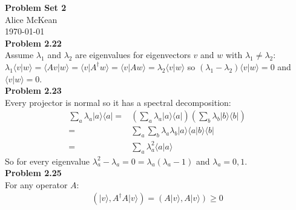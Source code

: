 \documentclass[fleqn]{article}
\newcommand{\problem}[1]{\large\textbf{Problem #1}\normalsize}
\newcommand{\bra}[1]{\ensuremath{\langle #1 |}}
\newcommand{\ket}[1]{\ensuremath{| #1 \rangle}}
\newcommand{\innerF}[2]{\ensuremath{\langle #1 | #2 \rangle}}
\newcommand{\outerF}[2]{\ket{#1} \bra{#2}}
\begin{document}
\noindent\Large\textbf{Problem Set 2} \\
\normalsize
Alice McKean \\
\today \\

\problem{2.22} \\
Assume $\lambda_1$ and $\lambda_2$ are eigenvalues for eigenvectors $v$ and $w$
with $\lambda_1 \neq \lambda_2$: \\
$\lambda_1\innerF{v}{w} = \innerF{Av}{w} = \innerF{v}{A^{\dagger}w} =
\innerF{v}{Aw} = \lambda_2\innerF{v}{w}$ so
$(\lambda_1 - \lambda_2)\innerF{v}{w} = 0$ and $\innerF{v}{w} = 0$. \\

\problem{2.23} \\
Every projector is normal so it has a spectral decomposition:
\begin{align*}
  \sum_{a} \lambda_{a} \outerF{a}{a} =& \left( \sum_{a} \lambda_{a} \outerF{a}{a} \right)
                                       \left( \sum_{b} \lambda_{b} \outerF{b}{b} \right) \\
  =& \sum_{a} \sum_{b} \lambda_{a} \lambda_{b} \ket{a} \innerF{a}{b} \bra{b} \\
  =& \sum_{a} \lambda_{a}^2 \innerF{a}{a}
\end{align*}
So for every eigenvalue
$\lambda_{a}^2 - \lambda_{a} = 0 = \lambda_{a} (\lambda_{a} - 1)$
and $\lambda_{a} = 0 , 1$. \\

\problem{2.25} \\
For any operator $A$:
\vspace{-0.7em}
\begin{align*}
  ( \ket{v} , A^{\dagger} A \ket{v} ) = ( A\ket{v} , A\ket{v} ) \geq 0
\end{align*}
\end{document}
